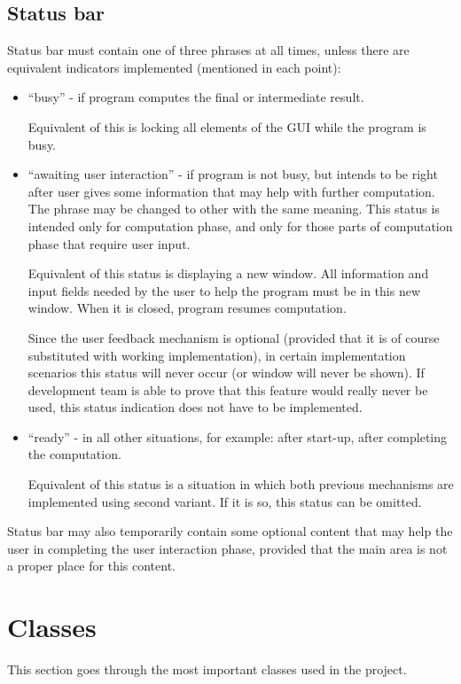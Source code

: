 \documentclass{article}
\begin{document}
\subsection{Status bar}
Status bar must contain one of three phrases at all times, unless there are equivalent indicators
implemented (mentioned in each point):
\begin{itemize}

  \item ``busy'' - if program computes the final or intermediate result. %
  
  Equivalent of this is locking all elements of the GUI while the program is busy.

  \item ``awaiting user interaction'' - if program is not busy, but intends to be right after user
  gives some information that may help with further computation. The phrase may be changed to other
  with the same meaning. This status is intended only for computation phase, and only for those
  parts of computation phase that require user input.
  
  Equivalent of this status is displaying a new window. All information and input fields needed by
  the user to help the program must be in this new window. When it is closed, program resumes
  computation.
  
  Since the user feedback mechanism is optional (provided that it is of course substituted with
  working implementation), in certain implementation scenarios this status will never occur (or
  window will never be shown). If development team is able to prove that this feature would really
  never be used, this status indication does not have to be implemented.

  \item ``ready'' - in all other situations, for example: after start-up, %
  after completing the computation.
  
  Equivalent of this status is a situation in which both previous mechanisms are implemented using
  second variant. If it is so, this status can be omitted.

\end{itemize}

Status bar may also temporarily contain some optional content that may help the user in completing
the user interaction phase, provided that the main area is not a proper place for this content.

\section{Classes}
This section goes through the most important classes used in the project.
\end{document}
